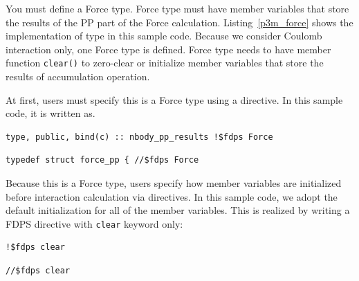 You must define a \textsf{Force} type. \textsf{Force} type must have member variables that store the results of the PP part of the Force calculation. Listing~\ref{p3m_force} shows the implementation of  type in this sample code. Because we consider Coulomb interaction only, one \textsf{Force} type is defined.
\ifCpp
\textsf{Force} type needs to have member function \texttt{clear()} to zero-clear or initialize member variables that store the results of accumulation operation.
\endifCpp

\ifCpp

\endifCpp
\ifFtn

\endifFtn
\ifC

\endifC

\ifIF
At first, users must specify this \structure is a \textsf{Force} type using a directive. In this sample code, it is written as.
\endifIF
\ifFtn
\begin{screen}
\begin{verbatim}
type, public, bind(c) :: nbody_pp_results !$fdps Force
\end{verbatim}
\end{screen}
\endifFtn
\ifC
\begin{screen}
\begin{verbatim}
typedef struct force_pp { //$fdps Force
\end{verbatim}
\end{screen}
\endifC
\ifIF
Because this \structure is a \textsf{Force} type, users  specify how member variables are initialized before interaction calculation via  directives. In this sample code, we adopt the default initialization for all of the member variables. This is realized by writing a FDPS directive with \texttt{clear} keyword only:
\endifIF
\ifFtn
\begin{screen}
\begin{verbatim}
!$fdps clear
\end{verbatim}
\end{screen}
\endifFtn
\ifC
\begin{screen}
\begin{verbatim}
//$fdps clear
\end{verbatim}
\end{screen}
\endifC


